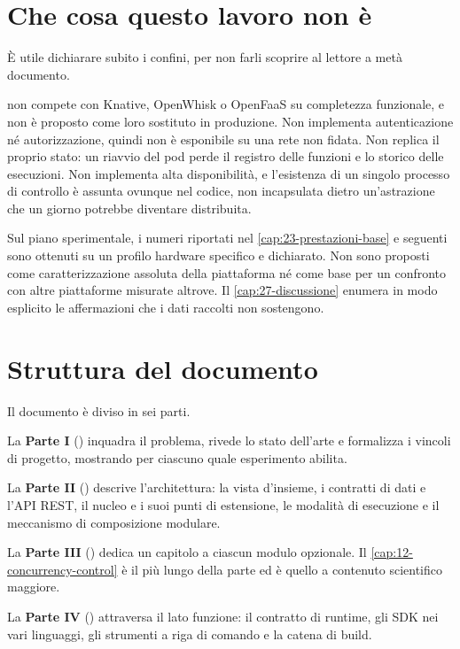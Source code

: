 \section{Che cosa questo lavoro non \`e}

\`E utile dichiarare subito i confini, per non farli scoprire al lettore a
met\`a documento.

\nf{} non compete con Knative, OpenWhisk o OpenFaaS su completezza funzionale, e
non \`e proposto come loro sostituto in produzione. Non implementa
autenticazione n\'e autorizzazione, quindi non \`e esponibile su una rete non
fidata. Non replica il proprio stato: un riavvio del pod perde il registro delle
funzioni e lo storico delle esecuzioni. Non implementa alta disponibilit\`a, e
l'esistenza di un singolo processo di controllo \`e assunta ovunque nel codice,
non incapsulata dietro un'astrazione che un giorno potrebbe diventare
distribuita.

Sul piano sperimentale, i numeri riportati nel \cref{cap:23-prestazioni-base} e
seguenti sono ottenuti su un profilo hardware specifico e dichiarato. Non sono
proposti come caratterizzazione assoluta della piattaforma n\'e come base per un
confronto con altre piattaforme misurate altrove. Il
\cref{cap:27-discussione} enumera in modo esplicito le affermazioni che i dati
raccolti non sostengono.

\section{Struttura del documento}

Il documento \`e diviso in sei parti.

La \textbf{Parte I} ()
inquadra il problema, rivede lo stato dell'arte e formalizza i vincoli di
progetto, mostrando per ciascuno quale esperimento abilita.

La \textbf{Parte II} ()
descrive l'architettura: la vista d'insieme, i contratti di dati e l'API REST,
il nucleo e i suoi punti di estensione, le modalit\`a di esecuzione e il
meccanismo di composizione modulare.

La \textbf{Parte III} ()
dedica un capitolo a ciascun modulo opzionale. Il
\cref{cap:12-concurrency-control} \`e il pi\`u lungo della parte ed \`e quello a
contenuto scientifico maggiore.

La \textbf{Parte IV} ()
attraversa il lato funzione: il contratto di runtime, gli SDK nei vari
linguaggi, gli strumenti a riga di comando e la catena di build.

